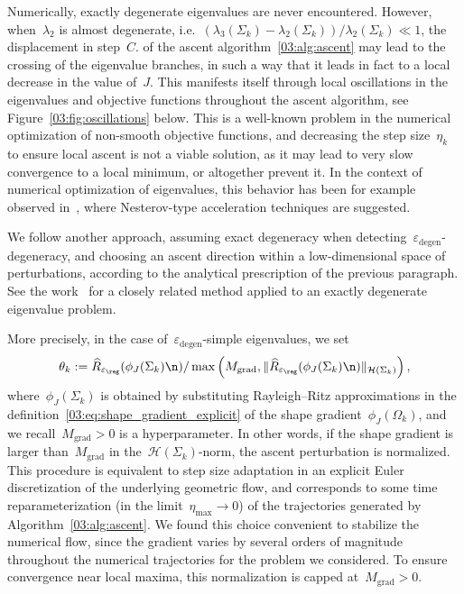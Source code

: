 Numerically, exactly degenerate eigenvalues are never encountered. However, when~$\lambda_2$ is almost degenerate, i.e.~$(\lambda_3(\Sigma_k)-\lambda_2(\Sigma_k))/\lambda_2(\Sigma_k) \ll 1$, the displacement in step~$C.$ of the ascent algorithm~\ref{03:alg:ascent} may lead to the crossing of the eigenvalue branches, in such a way that it leads in fact to a local decrease in the value of~$J$.
This manifests itself through local oscillations in the eigenvalues and objective functions throughout the ascent algorithm, see Figure~\ref{03:fig:oscillations} below.
This is a well-known problem in the numerical optimization of non-smooth objective functions, and decreasing the step size~$\eta_k$ to ensure local ascent is not a viable solution, as it may lead to very slow convergence to a local minimum, or altogether prevent it.
In the context of numerical optimization of eigenvalues, this behavior has been for example observed in~\cite{CTZ24}, where Nesterov-type acceleration techniques are suggested.

We follow another approach, assuming exact degeneracy when detecting~$\varepsilon_{\mathrm{degen}}$-degeneracy, and choosing an ascent direction within a low-dimensional space of perturbations, according to the analytical prescription of the previous paragraph.
See the work~\cite{DG06} for a closely related method applied to an exactly degenerate eigenvalue problem.

More precisely, in the case of~$\varepsilon_{\mathrm{degen}}$-simple eigenvalues, we set
\begin{equation}
    \theta_k := \widehat{R}_{\varepsilon_\reg}(\phi_J(\Sigma_k)\n) / \max\left(M_{\mathrm{grad}},\|\widehat{R}_{\varepsilon_\reg}(\phi_J(\Sigma_k)\n)\|_{\mathcal H(\Sigma_k)}\right),
\end{equation}
where~$\phi_J(\Sigma_k)$ is obtained by substituting Rayleigh--Ritz approximations in the definition~\eqref{03:eq:shape_gradient_explicit} of the shape gradient~$\phi_J(\Omega_k)$, and we recall~$M_{\mathrm{grad}}>0$ is a hyperparameter.
In other words, if the shape gradient is larger than~$M_{\mathrm{grad}}$ in the~$\mathcal H(\Sigma_k)$-norm, the ascent perturbation is normalized. This procedure is equivalent to step size adaptation in an explicit Euler discretization of the underlying geometric flow, and corresponds to some time reparameterization (in the limit~$\eta_{\max}\to 0$) of the trajectories generated by Algorithm~\ref{03:alg:ascent}.
We found this choice convenient to stabilize the numerical flow, since the gradient varies by several orders of magnitude throughout the numerical trajectories for the problem we considered. To ensure convergence near local maxima, this normalization is capped at~$M_{\mathrm{grad}}>0$.

